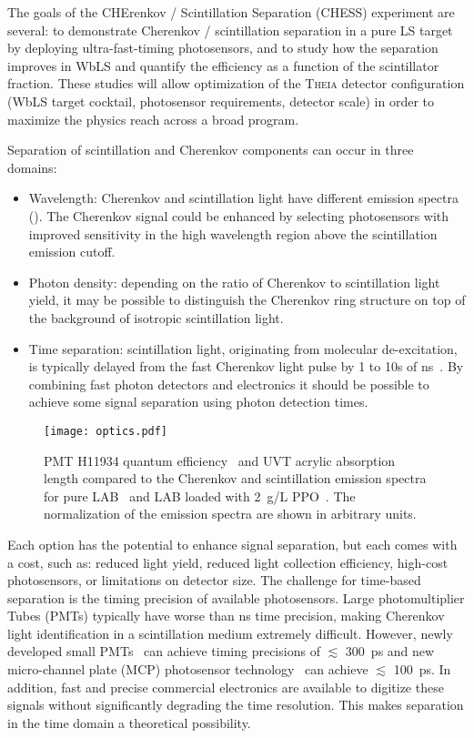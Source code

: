 The goals of the CHErenkov / Scintillation Separation (CHESS) experiment are several: to demonstrate Cherenkov / scintillation separation in a pure LS target by deploying ultra-fast-timing photosensors, and to study how the separation improves in WbLS and quantify the efficiency as a function of the scintillator fraction.  These studies will allow optimization of the \textsc{Theia} detector configuration (WbLS target cocktail, photosensor requirements, detector scale) in order to maximize the physics reach across a broad program. 

Separation of scintillation and Cherenkov components can occur in three domains:
\begin{itemize}
    \item Wavelength:  Cherenkov and scintillation light have  different emission spectra (). The Cherenkov signal could be enhanced by selecting photosensors  with improved sensitivity in the high wavelength region above the scintillation emission cutoff.
	\item Photon density: depending on the ratio of Cherenkov to scintillation light yield, it may be possible to distinguish the  Cherenkov ring structure on top of the background of isotropic scintillation light. 
	\item Time separation: scintillation light, originating from molecular de-excitation, is typically delayed from the fast Cherenkov light pulse by 1 to 10s of ns~\cite{cherenkov, birks}. By combining fast photon detectors and electronics it should be possible to achieve some signal separation using photon detection times.  
\end{itemize}


\begin{figure}
	\centering
	\texttt{[image: optics.pdf]}
	\caption{\label{fig:optics} PMT H11934 quantum efficiency~\cite{h11934} and UVT acrylic absorption length compared to the Cherenkov and scintillation emission spectra for pure LAB~\cite{lab_emission} and LAB loaded with 2~g/L PPO~\cite{snop_private}. The normalization of the emission spectra are shown in arbitrary units.}
\end{figure}

Each option has the potential to enhance signal separation, but each comes with a cost, such as: reduced light yield, reduced light collection efficiency, high-cost photosensors, or limitations on detector size.  The challenge for time-based separation is the timing precision of  available photosensors. Large photomultiplier Tubes (PMTs) typically have worse than ns  time precision, making Cherenkov light identification in a scintillation medium extremely difficult. However, newly developed small PMTs~\cite{h11934} can achieve  timing precisions of $\lesssim$ 300~ps and new micro-channel plate (MCP) photosensor technology~\cite{mcp, lappd, lappd2} can achieve  $\lesssim$ 100~ps. In addition, fast and precise commercial electronics are available to digitize these signals without significantly degrading the time resolution. This makes  separation in the time domain a  theoretical possibility.

